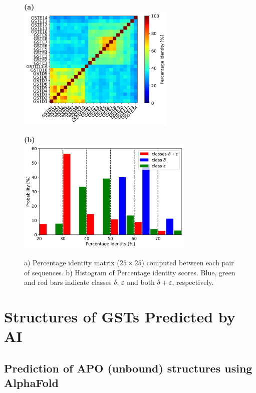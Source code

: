 \begin{figure}[h!]
	\label{Sequence and Structure matricies}
	\begin{minipage}{.48\linewidth}
		\textbf{(a)}\\
		\includegraphics[height = 6cm]{figures/PercentID_matrix.jpg}
	\end{minipage}
	\begin{minipage}{.48\linewidth}
		\textbf{(b)}\\
		\includegraphics[height = 5.5cm]{figures/PercentID_proba.jpg}
		\vspace{.15cm}
	\end{minipage}
	\caption{a) Percentage identity matrix ($25\times 25$) computed between each pair of sequences. b) Histogram of Percentage identity scores. Blue, green and red bars indicate classes $\delta$; $\varepsilon$ and both $\delta+\varepsilon$, respectively.}
\end{figure}

\section{Structures of GSTs Predicted by AI}

\subsection{Prediction of APO (unbound) structures using AlphaFold}

